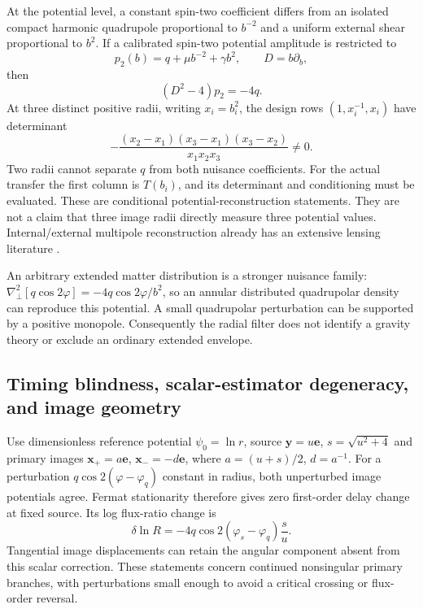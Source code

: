 At the potential level, a constant spin-two coefficient differs from an isolated compact harmonic quadrupole proportional to $b^{-2}$ and a uniform external shear proportional to $b^2$. If a calibrated spin-two potential amplitude is restricted to
\begin{equation}
 p_2(b)=q+\mu b^{-2}+\gamma b^2,\qquad D=b\partial_b,
\end{equation}
then
\begin{equation}
 (D^2-4)p_2=-4q.
\end{equation}
At three distinct positive radii, writing $x_i=b_i^2$, the design rows $(1,x_i^{-1},x_i)$ have determinant
\begin{equation}
 -\frac{(x_2-x_1)(x_3-x_1)(x_3-x_2)}{x_1x_2x_3}\ne0.
\end{equation}
Two radii cannot separate $q$ from both nuisance coefficients. For the actual transfer the first column is $T(b_i)$, and its determinant and conditioning must be evaluated. These are conditional potential-reconstruction statements. They are not a claim that three image radii directly measure three potential values. Internal/external multipole reconstruction already has an extensive lensing literature \cite{Trotter2000,Bernstein2009}.

An arbitrary extended matter distribution is a stronger nuisance family: $\nabla_\perp^2[q\cos2\varphi]=-4q\cos2\varphi/b^2$, so an annular distributed quadrupolar density can reproduce this potential. A small quadrupolar perturbation can be supported by a positive monopole. Consequently the radial filter does not identify a gravity theory or exclude an ordinary extended envelope.

\subsection{Timing blindness, scalar-estimator degeneracy, and image geometry}

Use dimensionless reference potential $\psi_0=\ln r$, source $\mathbf y=u\mathbf e$, $s=\sqrt{u^2+4}$ and primary images $\mathbf x_+=a\mathbf e$, $\mathbf x_-=-d\mathbf e$, where $a=(u+s)/2$, $d=a^{-1}$. For a perturbation $q\cos2(\varphi-\varphi_q)$ constant in radius, both unperturbed image potentials agree. Fermat stationarity therefore gives zero first-order delay change at fixed source. Its log flux-ratio change is
\begin{equation}
 \delta\ln R=-4q\cos2(\varphi_s-\varphi_q)\frac{s}{u}.
\end{equation}
Tangential image displacements can retain the angular component absent from this scalar correction. These statements concern continued nonsingular primary branches, with perturbations small enough to avoid a critical crossing or flux-order reversal.

